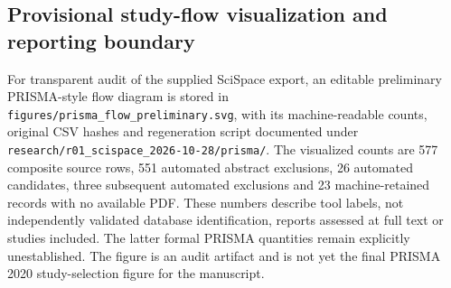 \subsection{Provisional study-flow visualization and reporting boundary}

For transparent audit of the supplied SciSpace export, an editable preliminary PRISMA-style flow diagram is stored in \texttt{figures/prisma\_flow\_preliminary.svg}, with its machine-readable counts, original CSV hashes and regeneration script documented under \texttt{research/r01\_scispace\_2026-10-28/prisma/}. The visualized counts are 577 composite source rows, 551 automated abstract exclusions, 26 automated candidates, three subsequent automated exclusions and 23 machine-retained records with no available PDF. These numbers describe tool labels, not independently validated database identification, reports assessed at full text or studies included. The latter formal PRISMA quantities remain explicitly unestablished. The figure is an audit artifact and is not yet the final PRISMA 2020 study-selection figure for the manuscript.
